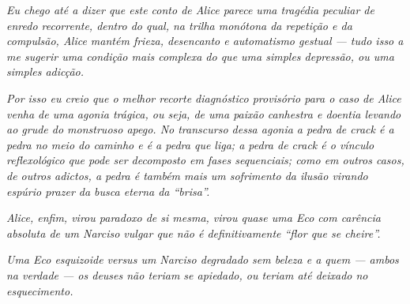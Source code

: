 \emph{Eu chego até a dizer que este conto de Alice parece uma tragédia
peculiar de enredo recorrente, dentro do qual, na trilha monótona da
repetição e da compulsão, Alice mantém frieza, desencanto e automatismo gestual --- tudo isso a me sugerir uma condição mais complexa do que
uma simples depressão, ou uma simples adicção.}

\emph{Por isso eu creio que o melhor recorte diagnóstico provisório para
o caso de Alice venha de uma agonia trágica, ou seja, de uma paixão
canhestra e doentia levando ao grude do monstruoso apego. No transcurso
dessa agonia a pedra de crack é a pedra no meio do caminho e é a pedra
que liga; a pedra de crack é o vínculo reflexológico que pode ser
decomposto em fases sequenciais; como em outros casos, de outros
adictos, a pedra é também mais um sofrimento da ilusão virando espúrio
prazer da busca eterna da ``brisa''.}

\emph{Alice, enfim, virou paradoxo de si mesma, virou quase uma Eco com
carência absoluta de um Narciso vulgar que não é definitivamente ``flor
que se cheire''.}

\emph{Uma Eco esquizoide versus um Narciso degradado sem beleza e a quem
--- ambos na verdade --- os deuses não teriam se apiedado, ou teriam até
deixado no esquecimento. ~}
